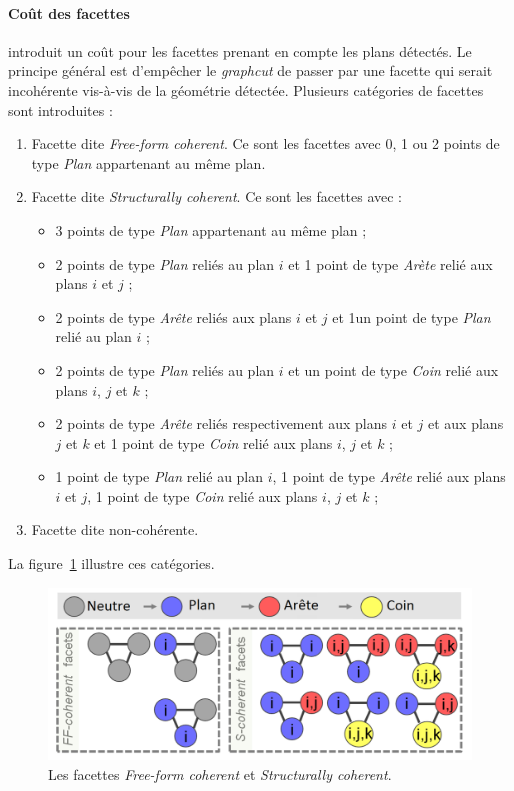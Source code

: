 ﻿\documentclass[12pt, twoside]{article}
\begin{document}
\paragraph{Coût des facettes} \cite{maillage2} introduit un coût pour les facettes prenant en compte les plans détectés. Le principe général est d'empêcher le \textit{graphcut} de passer par une facette qui serait incohérente vis-à-vis de la géométrie détectée. Plusieurs catégories de facettes sont introduites :
\begin{enumerate}
  \item Facette dite \textit{Free-form coherent}. Ce sont les facettes avec 0, 1 ou 2 points de type \textit{Plan} appartenant au même plan.
  \item Facette dite \textit{Structurally coherent}. Ce sont les facettes avec :
  \begin{itemize}
    \item 3 points de type \textit{Plan} appartenant au même plan ;
    \item 2 points de type \textit{Plan} reliés au plan $i$ et 1 point de type \textit{Arète} relié aux plans $i$ et $j$ ;
    \item 2 points de type \textit{Arête} reliés aux plans $i$ et $j$ et 1un point de type \textit{Plan} relié au plan $i$ ;
    \item 2 points de type \textit{Plan} reliés au plan $i$ et un point de type \textit{Coin} relié aux plans $i$, $j$ et $k$ ;
    \item 2 points de type \textit{Arête} reliés respectivement aux plans $i$ et $j$ et aux plans $j$ et $k$ et 1 point de type \textit{Coin} relié aux plans $i$, $j$ et $k$ ;
    \item 1 point de type \textit{Plan} relié au plan $i$, 1 point de type \textit{Arête} relié aux plans $i$ et $j$, 1 point de type \textit{Coin} relié aux plans $i$, $j$ et $k$ ;
  \end{itemize}
  \item Facette dite non-cohérente.
\end{enumerate}

La figure~\ref{fig:coherence} illustre ces catégories.

\begin{figure}[h]
\centering
\includegraphics[scale=0.4]{coherent.png}
\caption{\label{fig:coherence} Les facettes \textit{Free-form coherent} et \textit{Structurally coherent}.}
\end{figure}
\end{document}
